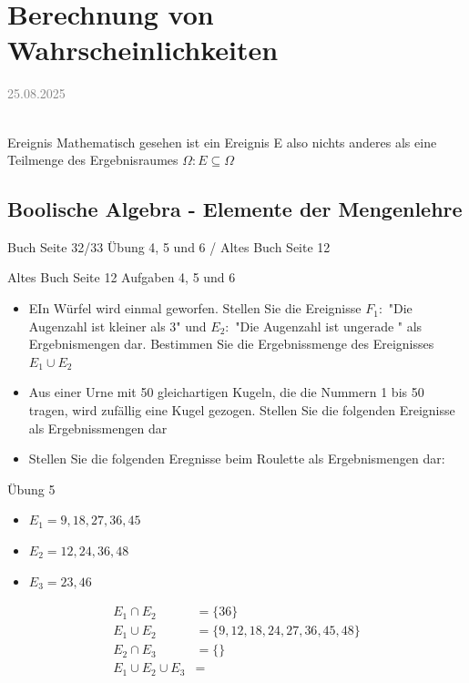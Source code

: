 \documentclass[11pt,a4paper,oneside]{article}
\newcommand{\lessondate}[1]{
	\noindent\hfill\textcolor{gray}{\textsc{#1}} \\
	\vspace{0.5cm}
}
\begin{document}
	
	\newpage

	
	\section{Berechnung von Wahrscheinlichkeiten}
	
	\lessondate{25.08.2025}\\
	
	\begin{theo}{Ereignis}
		Mathematisch gesehen ist ein Ereignis E also nichts anderes als eine Teilmenge des Ergebnisraumes $\Omega: E \subseteq  \Omega$
	\end{theo}
	
	\subsection{Boolische Algebra - Elemente der Mengenlehre}
	
	Buch Seite 32/33 Übung 4, 5 und 6 / Altes Buch Seite 12
	
	\begin{aufgabe}{Altes Buch Seite 12 Aufgaben 4, 5 und 6}
		\begin{itemize}
			\item [Übung 4] EIn Würfel wird einmal geworfen. Stellen Sie die Ereignisse $F_1:$ "Die Augenzahl ist kleiner als 3" und $E_2:$ "Die Augenzahl ist ungerade " als Ergebnismengen dar. Bestimmen Sie die Ergebnissmenge des Ereignisses $E_1 \cup E_2$
			\item [Übung 5] Aus einer Urne mit 50 gleichartigen Kugeln, die die Nummern 1 bis 50 tragen, wird zufällig eine Kugel gezogen. Stellen Sie die folgenden Ereignisse als Ergebnissmengen dar
			\item [Übung 6] Stellen Sie die folgenden Eregnisse beim Roulette als Ergebnismengen dar:  
		\end{itemize}
	\end{aufgabe}
	
	\begin{loesung}{Übung 5}
		\begin{itemize}
			\item $E_1 = 9, 18, 27, 36, 45$ 
			\item $E_2 = 12, 24, 36, 48$
			\item $E_3 = 23, 46$
		\end{itemize}
		\begin{align*}
			E_1 \cap E_2 &= \{36\}\\
			E_1 \cup E_2 &= \{9, 12, 18, 24, 27, 36, 45, 48\}\\
			E_2 \cap E_3 &= \{\}\\
			E_1 \cup E_2 \cup E_3 &= 
		\end{align*}
	\end{loesung}
	
\end{document}
